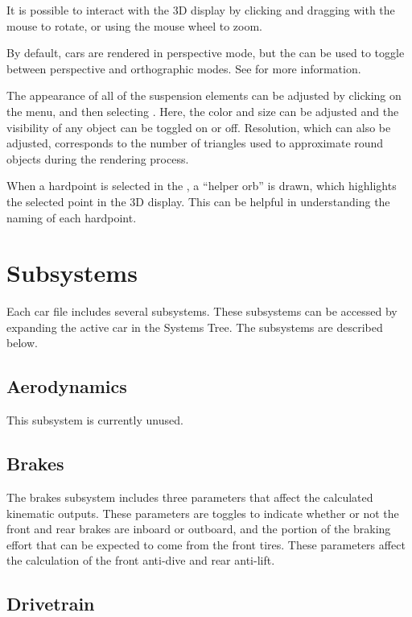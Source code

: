 It is possible to interact with the 3D display by clicking and dragging with the mouse to rotate, or using the mouse wheel to zoom.

By default, cars are rendered in perspective mode, but the  can be used to toggle between perspective and orthographic modes.  See  for more information.

The appearance of all of the suspension elements can be adjusted by clicking on the  menu, and then selecting .  Here, the color and size can be adjusted and the visibility of any object can be toggled on or off.  Resolution, which can also be adjusted, corresponds to the number of triangles used to approximate round objects during the rendering process.

When a hardpoint is selected in the , a ``helper orb'' is drawn, which highlights the selected point in the 3D display.  This can be helpful in understanding the naming of each hardpoint.

\section{Subsystems} \label{sec:subsystems}

Each car file includes several subsystems.  These subsystems can be accessed by expanding the active car in the Systems Tree.  The subsystems are described below.

\subsection{Aerodynamics} \label{ssec:aerodynamics}

This subsystem is currently unused.

\subsection{Brakes} \label{ssec:brakes}

The brakes subsystem includes three parameters that affect the calculated kinematic outputs.  These parameters are toggles to indicate whether or not the front and rear brakes are inboard or outboard, and the portion of the braking effort that can be expected to come from the front tires.  These parameters affect the calculation of the front anti-dive and rear anti-lift.

\subsection{Drivetrain} \label{ssec:drivetrain}

